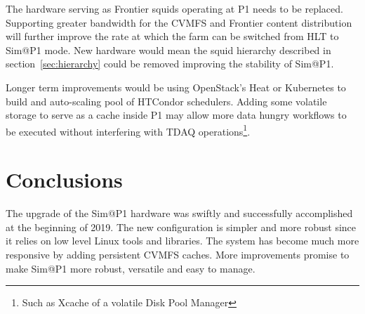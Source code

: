 \documentclass{webofc}
\begin{document}
The hardware serving as Frontier squids operating at P1 needs to be replaced.
Supporting greater bandwidth for the CVMFS and Frontier content distribution
will further improve the rate at which the farm can be switched from HLT to
Sim@P1 mode. New hardware would mean the squid hierarchy described
in section~\ref{sec:hierarchy} could be removed improving the stability of
Sim@P1.

Longer term improvements would be using OpenStack's Heat or Kubernetes to build
and auto-scaling pool of HTCondor schedulers. Adding some volatile storage to
serve as a cache inside P1 may allow more data hungry workflows to be executed
without interfering with TDAQ operations\footnote{Such as Xcache of a volatile
Disk Pool Manager}.

\section{Conclusions}
The upgrade of the Sim@P1 hardware was swiftly and successfully accomplished at
the beginning of 2019. The new configuration is simpler and more robust since
it relies on low level Linux tools and libraries. The system has become much
more responsive by adding persistent CVMFS caches. More improvements promise to
make Sim@P1 more robust, versatile and easy to manage.
\end{document}
